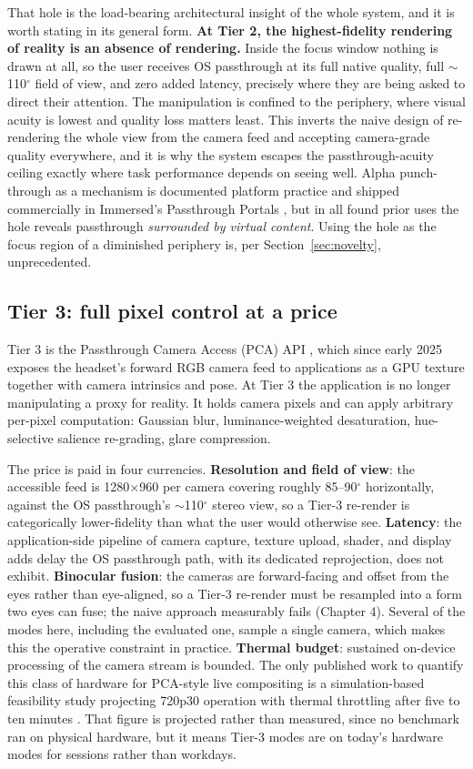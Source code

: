 That hole is the load-bearing architectural insight of the whole system, and it is worth stating in
its general form. \textbf{At Tier 2, the highest-fidelity rendering of reality is an absence of
rendering.} Inside the focus window nothing is drawn at all, so the user receives OS passthrough at
its full native quality, full $\sim$110$^{\circ}$ field of view, and zero added latency, precisely
where they are being asked to direct their attention. The manipulation is confined to the periphery,
where visual acuity is lowest and quality loss matters least. This inverts the naive design of
re-rendering the whole view from the camera feed and accepting camera-grade quality everywhere, and
it is why the system escapes the passthrough-acuity ceiling exactly where task performance depends on
seeing well. Alpha punch-through as a mechanism is documented platform practice \citep{meta2024b} and
shipped commercially in Immersed's Passthrough Portals \citep{immersed2022}, but in all found prior
uses the hole reveals passthrough \textit{surrounded by virtual content}. Using the hole as the focus
region of a diminished periphery is, per Section~\ref{sec:novelty}, unprecedented.

\subsection{Tier 3: full pixel control at a price}

Tier 3 is the Passthrough Camera Access (PCA) API \citep{meta2025}, which since early 2025 exposes
the headset's forward RGB camera feed to applications as a GPU texture together with camera
intrinsics and pose. At Tier 3 the application is no longer manipulating a proxy for reality. It
holds camera pixels and can apply arbitrary per-pixel computation: Gaussian blur, luminance-weighted
desaturation, hue-selective salience re-grading, glare compression.

The price is paid in four currencies. \textbf{Resolution and field of view}: the accessible feed is
1280$\times$960 per camera covering roughly 85–90$^{\circ}$ horizontally, against the OS
passthrough's $\sim$110$^{\circ}$ stereo view, so a Tier-3 re-render is categorically lower-fidelity
than what the user would otherwise see. \textbf{Latency}: the application-side pipeline of camera
capture, texture upload, shader, and display adds delay the OS passthrough path, with its dedicated
reprojection, does not exhibit. \textbf{Binocular fusion}: the cameras are forward-facing and
offset from the eyes rather than eye-aligned, so a Tier-3 re-render must be resampled into a
form two eyes can fuse; the naive approach measurably fails (Chapter 4). Several of the modes
here, including the evaluated one, sample a single camera, which makes this the operative
constraint in practice.
\textbf{Thermal budget}: sustained on-device processing of the camera stream is bounded. The only
published work to quantify this class of hardware for PCA-style live compositing is a
simulation-based feasibility study projecting 720p30 operation with thermal throttling after five to
ten minutes \citep{laghari2025}. That figure is projected rather than measured, since no benchmark
ran on physical hardware, but it means Tier-3 modes are on today's hardware modes for sessions rather
than workdays.

